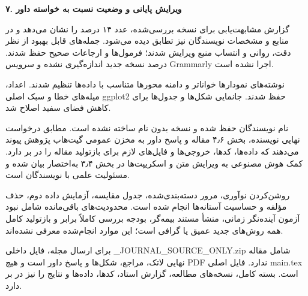 \documentclass[11pt,a4paper]{article}
\newcommand{\lr}[1]{{\latinfont\beginL#1\endL}}
\newcommand{\fa}[1]{\par\begingroup\raggedleft\noindent\beginR#1\endR\par\endgroup}
\newcommand{\fatitle}[1]{\fa{\large\bfseries #1}\medskip}
\begin{document}
\fatitle{۷. ویرایش پایانی و وضعیت نسبت به خواسته داور}
\fa{گزارش مشابهت‌یابی برای نسخه بررسی‌شده، عدد ۱۴ درصد را نشان می‌دهد و در منابع و مشخصات نویسندگان نیز تطابق دیده می‌شود. جمله‌های قابل بهبود از نظر دقت، روانی و انتساب منبع ویرایش شدند؛ فرمول‌ها و ارجاعات صحیح حفظ شدند. درصد نسخه جدید اندازه‌گیری نشده و سرویس \lr{Grammarly} اجرا نشده است.}
\fa{نوشته‌های نمودارها خواناتر و دامنه محورها متناسب با داده‌ها تنظیم شدند. اعداد، میله‌های خطا و سبک اصلی \lr{ggplot2} حفظ شدند. جانمایی شکل‌ها و جدول‌ها برای کاهش فضای سفید اصلاح شد.}
\fa{نام نویسندگان حفظ شده و نسخه بدون نام ساخته نشده است. مطابق درخواست نهایی نویسنده، بخش ۴٫۶ مقاله و پاسخ داور به مخزن عمومی گیت‌هاب پژوهش پیوند می‌دهند که داده‌ها، کدها، خروجی‌ها و فایل‌های لازم برای بازتولید مقاله را در بر دارد. کمک هوش مصنوعی به ویرایش متن و اسکریپت‌ها در بخش ۳٫۴ به‌اختصار بیان شده و مسئولیت علمی با نویسندگان است.}
\fa{روشن‌کردن نوآوری، مرور دسته‌بندی‌شده، جدول مقایسه، آزمایش داده دوم، حذف مؤلفه و حساسیت آستانه‌ها انجام شده است. محدودیت‌های باقی‌مانده شامل نبود آزمون آینده‌نگر زمانی، منشأ مستند بیمه‌گر، بودجه بررسی کاملاً برابر و بازتولید کامل همه روش‌های جدید عمیق یا گرافی است؛ این موارد انجام‌شده معرفی نشده‌اند.}
\fa{برای ارسال مجله، فایل داخلی \lr{00\_JOURNAL\_SOURCE\_ONLY.zip} شامل مقاله نهایی لاتک، مراجع، شکل‌ها و پاسخ داور است و هیچ \lr{PDF} ندارد. فایل اصلی \lr{main.tex} است. بسته کامل، نسخه‌های مطالعه، گزارش استاد، کدها، داده‌ها و نتایج را نیز در بر دارد.}
\end{document}
